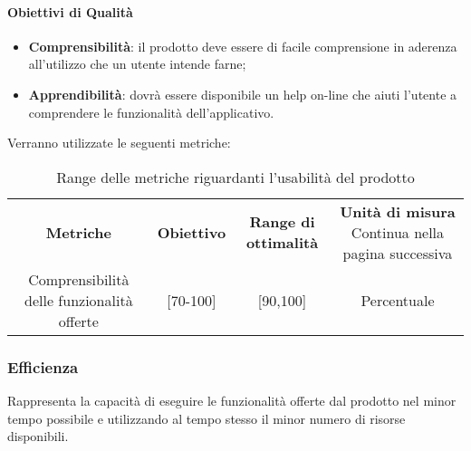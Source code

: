         \paragraph{Obiettivi di Qualità}
        \begin{itemize}
            \item \textbf{Comprensibilità}: il prodotto deve essere di facile comprensione in aderenza all'utilizzo che un utente intende farne;
            \item \textbf{Apprendibilità}: dovrà essere disponibile un help on-line che aiuti l'utente a comprendere le funzionalità dell’applicativo.
        \end{itemize}
        Verranno utilizzate le seguenti metriche:
        \begin{center}
            \renewcommand{\arraystretch}{2.2}
            
            \begin{longtable}{c c c c }
              
              \rowcolor[HTML]{232f3e}
            
              \rowcolors{1}{tableRow}{}
              \color[HTML]{FFFFFF} \textbf{Metriche} & \color[HTML]{FFFFFF} \centering\textbf{Obiettivo} & \color[HTML]{FFFFFF} \centering\textbf{Range di ottimalità} & \color[HTML]{FFFFFF} \centering\textbf{Unità di misura} 
            \endhead
            \rowcolor{white}\multicolumn{1}{c}
               { Continua nella pagina successiva} \\
               \endfoot
               \caption [Range delle metriche riguardanti l'usabilità del prodotto]{Range delle metriche riguardanti l'usabilità del prodotto}
              \label{tabella:reqP1}
               \endlastfoot
               Comprensibilità delle funzionalità offerte & [70-100] & [90,100] & Percentuale \\

            \end{longtable}

        \end{center}
       
        \subsubsection{Efficienza}
        Rappresenta la capacità di eseguire le funzionalità offerte dal prodotto nel minor tempo possibile e utilizzando al tempo stesso il minor numero di risorse disponibili.

